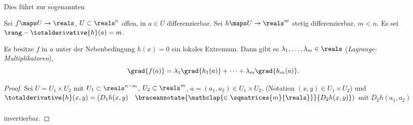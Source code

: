 Dies führt zur sogenannten 
\begin{satz}
  Sei \( f\maps U\to \reals \), \( U\subset \reals^n \) offen, in \( a\in U \) differenzierbar. Sei \( h\maps U\to \reals^m \) stetig differenzierbar, \( m<n \). Es sei \( \rang-{\totalderivative{h}(a)}=m \).

  Es besitze \( f \) in \( a \) unter der Nebenbedingung \( h(x)=0 \) ein lokales Extremum. Dann gibt es \( \lambda_1,\dotsc,\lambda_m\in \reals \) (\emph{Lagrange-Multiplikatoren}), \sd 
  \begin{equation*}
    \grad{f(a)}=\lambda_1 \grad{h_1(a)}+\dotsb+\lambda_m \grad{h_m(a)}.
  \end{equation*}
\end{satz}
\begin{proof}
  Sei \obda \( U=U_1\times U_2 \) mit \( U_1\subset \reals^{n-m} \), \( U_2\subset \reals^m \), \( a=(a_1,a_2)\in U_1\times U_2 \), (Notation \( (x,y)\in U_1\times U_2 \)) und \( \totalderivative{h}(x,y)=(D_1h(x,y) \quad  \braceannotate{\mathclap{\in \sqmatrices{m}{\reals}}}{D_2 h(x,y)})\vphantom{\underbrace{D_2 h(x,y)}_{\in \sqmatrices{m}{\reals}}} \) mit \( D_2h(a_1,a_2) \) invertierbar.
    

\end{proof}
